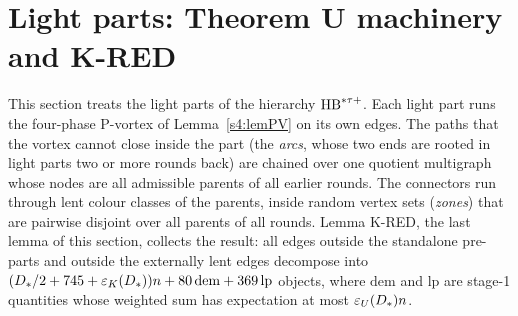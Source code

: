 \section{Light parts: Theorem U machinery and K-RED}\label{s5:sec}

This section treats the light parts of the hierarchy $\mathrm{HB}^{*\tau{+}}$. Each light part runs the four-phase P-vortex of Lemma~\ref{s4:lemPV} on its own edges. The paths that the vortex cannot close inside the part (the \emph{arcs}, whose two ends are rooted in light parts two or more rounds back) are chained over one quotient multigraph whose nodes are all admissible parents of all earlier rounds. The connectors run through lent colour classes of the parents, inside random vertex sets (\emph{zones}) that are pairwise disjoint over all parents of all rounds. Lemma K-RED, the last lemma of this section, collects the result: all edges outside the standalone pre-parts and outside the externally lent edges decompose into $(D_{*}/2+745+\varepsilon_{K}(D_{*}))n+80\,\mathrm{dem}+369\,\mathrm{lp}$ objects, where $\mathrm{dem}$ and $\mathrm{lp}$ are stage-1 quantities whose weighted sum has expectation at most $\varepsilon_{U}(D_{*})n$.

